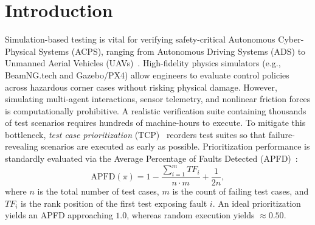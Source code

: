 \section{Introduction}
\label{sec:intro}

Simulation-based testing is vital for verifying safety-critical Autonomous Cyber-Physical Systems (ACPS), ranging from Autonomous Driving Systems (ADS) to Unmanned Aerial Vehicles (UAVs)~\cite{sdcscissor,sensodat}.
High-fidelity physics simulators (e.g., BeamNG.tech and Gazebo/PX4) allow engineers to evaluate control policies across hazardous corner cases without risking physical damage.
However, simulating multi-agent interactions, sensor telemetry, and nonlinear friction forces is computationally prohibitive.
A realistic verification suite containing thousands of test scenarios requires hundreds of machine-hours to execute.
To mitigate this bottleneck, \emph{test case prioritization} (TCP)~\cite{apfd,yooharman} reorders test suites so that failure-revealing scenarios are executed as early as possible.
Prioritization performance is standardly evaluated via the Average Percentage of Faults Detected (APFD)~\cite{apfd}:
\begin{equation}
\mathrm{APFD}(\pi) = 1 - \frac{\sum_{i=1}^{m} TF_i}{n \cdot m} + \frac{1}{2n},
\label{eq:apfd}
\end{equation}
where $n$ is the total number of test cases, $m$ is the count of failing test cases, and $TF_i$ is the rank position of the first test exposing fault $i$.
An ideal prioritization yields an APFD approaching $1.0$, whereas random execution yields $\approx 0.50$.

